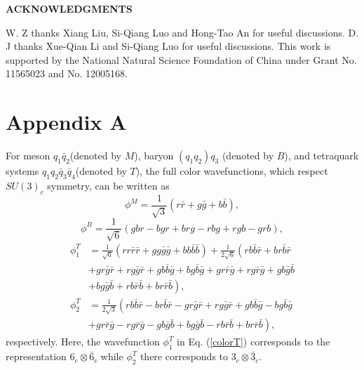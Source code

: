 \documentclass[12pt,prd,onecolumn,floatfix,nofootinbib]{revtex4}
\begin{document}
\medskip \textbf{ACKNOWLEDGMENTS}

W. Z thanks Xiang Liu, Si-Qiang Luo and Hong-Tao An for useful discussions.
D. J thanks Xue-Qian Li and Si-Qiang Luo for useful discussions. This work
is supported by the National Natural Science Foundation of China under Grant
No. 11565023 and No. 12005168.

\medskip

\section*{Appendix A}

\label{AppendixA} \setcounter{equation}{0} \renewcommand{\theequation}{A%
\arabic{equation}} For meson $q_{1}\bar{q}_{2}$(denoted by $M$), baryon $%
(q_{1}q_{2})q_{3}$ (denoted by $B$), and tetraquark systems $q_{1}q_{2}\bar{q%
}_{3}\bar{q}_{4}$(denoted by $T$), the full color wavefunctions, which
respect $SU(3)_{c}$ symmetry, can be written as
\begin{equation}
\phi ^{M}=\frac{1}{\sqrt{3}}\left( r\bar{r}+g\bar{g}+b\bar{b}\right) ,
\label{pcolorM}
\end{equation}%
\begin{equation}
\phi ^{B}=\frac{1}{\sqrt{6}}\left( gbr-bgr+brg-rbg+rgb-grb\right) ,
\label{pcolorB}
\end{equation}%
\begin{equation}
\begin{aligned} \phi_{1}^{T}&=\frac{1}{\sqrt{6}}
\left(rr\bar{r}\bar{r}+gg\bar{g}\bar{g}+bb\bar{b}\bar{b} \right)
+\frac{1}{2\sqrt{6}} \left(rb\bar{b}\bar{r}+br\bar{b}\bar{r} \right.\\
&\left.
+gr\bar{g}\bar{r}+rg\bar{g}\bar{r}+gb\bar{b}\bar{g}+bg\bar{b}\bar{g}+gr%
\bar{r}\bar{g}+rg\bar{r}\bar{g}+gb\bar{g}\bar{b} \right.\\ &\left.
+bg\bar{g}\bar{b}+rb\bar{r}\bar{b}+br\bar{r}\bar{b} \right), \\
\phi_{2}^{T}&=\frac{1}{2\sqrt{3}}
\left(rb\bar{b}\bar{r}-br\bar{b}\bar{r}-gr\bar{g}\bar{r}+rg\bar{g}\bar{r}+gb%
\bar{b}\bar{g}-bg\bar{b}\bar{g} \right.\\ &\left.
+gr\bar{r}\bar{g}-rg\bar{r}\bar{g}-gb\bar{g}\bar{b}+bg\bar{g}\bar{b}-rb%
\bar{r}\bar{b}+br\bar{r}\bar{b}\right), \end{aligned}  \label{pcolorT}
\end{equation}%
respectively. Here, the wavefunction $\phi _{1}^{T}$ in Eq. (\ref{colorT})
corresponds to the representation $6_{c}\otimes \bar{6}_{c}$ while $\phi
_{2}^{T}$ there corresponds to $3_{c}\otimes \bar{3}_{c}$.
\end{document}
